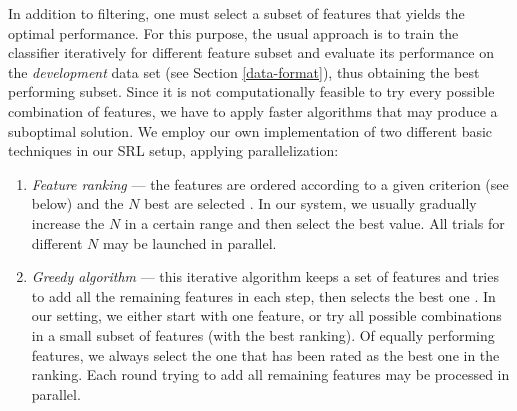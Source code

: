 \documentclass[12pt,notitlepage,a4paper]{report}
\begin{document}
In addition to filtering, one must select a subset of features that yields the optimal performance. For this purpose, the usual approach is to train the classifier iteratively for different feature subset and evaluate its performance on the \emph{development} data set (see Section \ref{data-format}), thus obtaining the best performing subset. Since it is not computationally feasible to try every possible combination of features, we have to apply faster algorithms that may produce a suboptimal solution. We employ our own implementation of two different basic techniques in our SRL setup, applying parallelization:
\begin{enumerate}
    \item \emph{Feature ranking} --- the features are ordered according to a given criterion (see below) and the $N$ best are selected \citep[p.~251ff.]{manning08}. In our system, we usually gradually increase the $N$ in a certain range and then select the best value. All trials for different $N$ may be launched in parallel.
    \item \emph{Greedy algorithm} --- this iterative algorithm keeps a set of features and tries to add all the remaining features in each step, then selects the best one \citep{caruana94}. In our setting, we either start with one feature, or try all possible combinations in a small subset of features (with the best ranking). Of equally performing features, we always select the one that has been rated as the best one in the ranking. Each round trying to add all remaining features may be processed in parallel.
\end{enumerate}
\end{document}
